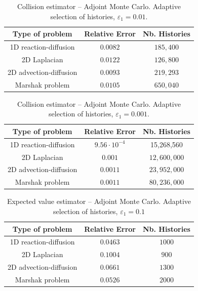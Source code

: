 \documentclass[times]{nlaauth}
\begin{document}
\begin{table}[!t]
\centering
\begin{tabular}{|c|c|c|}
\hline
\textbf{Type of problem} & \textbf{Relative Error} &\textbf{Nb. Histories}\\
\hline
1D reaction-diffusion & $0.0082$ & $185,400$\\
\hline
2D Laplacian & $0.0122$ & $126,800$\\
\hline
2D advection-diffusion & $0.0093$  & $219,293$\\
\hline
Marshak problem & $0.0105$ & $650,040$\\
\hline
\end{tabular}
\caption{Collision estimator -- Adjoint Monte Carlo. Adaptive selection of histories,
$\varepsilon_1=0.01$.}
\label{tab:Adj_adapt2}
\end{table}


\begin{table}[!t]
\centering
\begin{tabular}{|c|c|c|}
\hline
\textbf{Type of problem} & \textbf{Relative Error} &\textbf{Nb. Histories}\\
\hline
1D reaction-diffusion & $9.56 \cdot 10^{-4}$ & 15,268,560 \\
\hline
2D Laplacian & $0.001$ & $12,600,000$\\
\hline
2D advection-diffusion & $0.0011$  & $23,952,000$\\
\hline
Marshak problem & $0.0011$ &  $80,236,000$\\
\hline
\end{tabular}
\caption{Collision estimator -- Adjoint Monte Carlo. Adaptive selection of histories,
$\varepsilon_1=0.001$.}
\label{tab:Adj_adapt3}
\end{table}


\begin{table}[!t]
\centering
\begin{tabular}{|c|c|c|}
\hline
\textbf{Type of problem} & \textbf{Relative Error} &\textbf{Nb. Histories}\\
\hline
1D reaction-diffusion & $0.0463$ & $1000$\\
\hline
2D Laplacian & $0.1004$ & $900$\\
\hline
2D advection-diffusion & $0.0661$  & $1300$\\
\hline
Marshak problem & $0.0526$ & $2000$\\
\hline
\end{tabular}
\caption{Expected value estimator -- Adjoint Monte Carlo. Adaptive selection of
histories,
$\varepsilon_1=0.1$}
\label{tab:Adj_adapt4}
\end{table}
\end{document}
